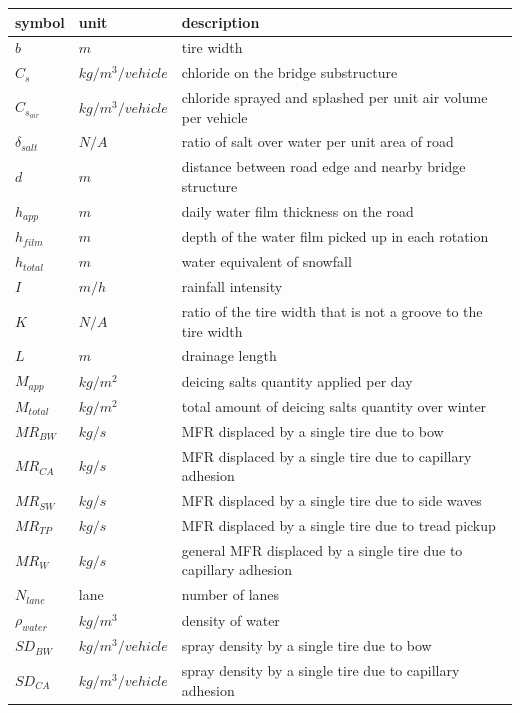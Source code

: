 \documentclass[12pt]{article}
\begin{document}
\renewcommand{\arraystretch}{1.2}
\noindent \begin{longtable*}{l l p{12cm}} \toprule
\textbf{symbol} & \textbf{unit} & \textbf{description}\\
\midrule $b$ & $m$ & tire width\\
$C_s$ & $kg/m^3/vehicle$ & chloride on the bridge substructure\\
$C_{s_{air}}$ & $kg/m^3/vehicle$ & chloride sprayed and splashed per unit air volume per vehicle\\
$\delta_{salt}$ & $N/A$ & ratio of salt over water per unit area of road\\
$d$ & $m$ & distance between road edge and nearby bridge structure\\
$h_{app}$ & $m$ & daily water film thickness on the road\\
$h_{film}$ & $m$ & depth of the water film picked up in each rotation\\
$h_{total}$ & $m$ & water equivalent of snowfall\\
$I$ & $m/h$ & rainfall intensity\\
$K$ & $N/A$ & ratio of the tire width that is not a groove to the tire width\\
$L$ & $m$ & drainage length\\
$M_{app}$ & $kg/m^2$ & deicing salts quantity applied per day\\
$M_{total}$ & $kg/m^2$ & total amount of deicing salts quantity over winter\\
$MR_{BW}$ & $kg/s$ & MFR displaced by a single tire due to bow\\
$MR_{CA}$ & $kg/s$ & MFR displaced by a single tire due to capillary adhesion\\
$MR_{SW}$ & $kg/s$ & MFR displaced by a single tire due to side waves\\
$MR_{TP}$ & $kg/s$ & MFR displaced by a single tire due to tread pickup\\
$MR_{W}$ & $kg/s$ & general MFR displaced by a single tire due to capillary adhesion\\
$N_{lane}$ & lane & number of lanes\\
$\rho_{water}$ & $kg/m^{3}$ & density of water\\
$SD_{BW}$ & $kg/m^{3}/vehicle$ & spray density by a single tire due to bow\\
$SD_{CA}$ & $kg/m^{3}/vehicle$ & spray density by a single tire due to capillary adhesion\\

\end{longtable*}
\end{document}
